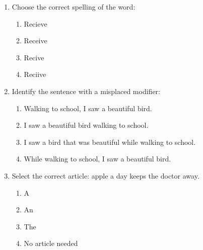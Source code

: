 \documentclass[12pt]{article}
\begin{document}
\begin{enumerate}
    \item Choose the correct spelling of the word:
    \begin{enumerate}[label=\Alph*.]
        \item Recieve
        \item Receive
        \item Recive
        \item Reciive
    \end{enumerate}
    \vspace{0.5cm}

    \item Identify the sentence with a misplaced modifier:
    \begin{enumerate}[label=\Alph*.]
        \item Walking to school, I saw a beautiful bird.
        \item I saw a beautiful bird walking to school.
        \item I saw a bird that was beautiful while walking to school.
        \item While walking to school, I saw a beautiful bird.
    \end{enumerate}
    \vspace{0.5cm}

    \item Select the correct article: \underline{\hspace{2cm}} apple a day keeps the doctor away.
    \begin{enumerate}[label=\Alph*.]
        \item A
        \item An
        \item The
        \item No article needed
    \end{enumerate}
    \vspace{0.5cm}

\end{enumerate}
\end{document}
